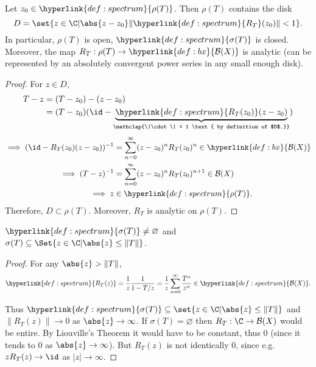 \documentclass{article}
\renewcommand{\emptyset}{\varnothing}
\begin{document}

\begin{prop}
    Let $z_0 \in \hyperlink{def:spectrum}{\rho(T)}$. Then $\rho(T)$ contains the disk
    \begin{equation*}
        D = \set{z \in \C | \abs{z - z_0} \|\hyperlink{def:spectrum}{R_T}(z_0)\| < 1}.
    \end{equation*}
    In particular, $\rho(T)$ is open, $\hyperlink{def:spectrum}{\sigma(T)}$ is closed.
    Moreover, the map $R_T : \rho(T) \to \hyperlink{def:bx}{\mathcal{B}(X)}$ is analytic (can be represented by an absolutely convergent power series in any small enough disk).
\end{prop}

\begin{proof}
    For $z \in D$,
    \begin{align*}
        T - z &= (T-z_0) - (z - z_0) \\
              &= (T - z_0)(\id - \underbrace{\hyperlink{def:spectrum}{R_T(z_0)}(z - z_0)}_{\mathclap{\|\cdot\| < 1 \text{ by definition of $D$.}}})
    \end{align*}
    \begin{align*}
        \implies (\id - R_T(z_0)(z-z_0))^{-1} &= \sum_{n=0}^\infty (z-z_0)^n R_T(z_0)^n \in \hyperlink{def:bx}{\mathcal{B}(X)} \\
        \implies (T-z)^{-1} &= \sum_{n=0}^\infty (z-z_0)^n R_T(z_0)^{n+1} \in \mathcal{B}(X) \\
        \implies z &\in \hyperlink{def:spectrum}{\rho(T)}.
    \end{align*}
    Therefore, $D \subset \rho(T)$. Moreover, $R_T$ is analytic on $\rho(T)$.
\end{proof}

\begin{cor}
    $\hyperlink{def:spectrum}{\sigma(T)} \neq \emptyset$ and $\sigma(T) \subseteq \Set{z \in \C | \abs{z} \leq \|T\|}$.
\end{cor}

\begin{proof}
    For any $\abs{z} > \|T\|$,
    \begin{equation*}
        \hyperlink{def:spectrum}{R_T(z)} = \frac{1}{z} \frac{1}{1 - T/z} = \frac{1}{z} \sum_{n=0}^\infty \frac{T^n}{z^n} \in\hyperlink{def:spectrum}{ \mathcal{B}(X)}.
    \end{equation*}

    Thus $\hyperlink{def:spectrum}{\sigma(T)} \subseteq \set{z \in \C | \abs{z} \leq \|T\|}$ and $\|R_T(z)\| \to 0$ as $\abs{z} \to \infty$.
    If $\sigma(T) = \emptyset$ then $R_T: \C \to \mathcal{B}(X)$ would be entire.
    By Liouville's Theorem it would have to be constant, thus $0$ (since it tends to $0$ as $\abs{z} \to \infty$).
    But $R_T(z)$ is not identically $0$, since e.g.\ $z R_T(z) \rightarrow \id$ as $|z| \to \infty$.
\end{proof}
\end{document}
